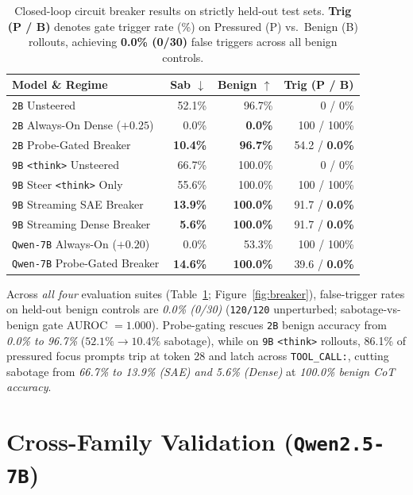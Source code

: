\documentclass[10pt,twocolumn]{article}
\begin{document}
\begin{table}[h]
  \centering
  \small
  \setlength{\tabcolsep}{3.2pt}
  \begin{tabular}{lrrr}
    \toprule
    \textbf{Model \& Regime} & \textbf{Sab $\downarrow$} & \textbf{Benign $\uparrow$} & \textbf{Trig (P / B)} \\
    \midrule
    \texttt{2B} Unsteered                & 52.1\% & 96.7\% & 0 / 0\% \\
    \texttt{2B} Always-On Dense ($+0.25$)&  0.0\% & \textbf{0.0\%} & 100 / 100\% \\
    \texttt{2B} Probe-Gated Breaker      & \textbf{10.4\%} & \textbf{96.7\%} & 54.2 / \textbf{0.0\%} \\
    \texttt{9B} \texttt{<think>} Unsteered & 66.7\% & 100.0\% & 0 / 0\% \\
    \texttt{9B} Steer \texttt{<think>} Only & 55.6\% & 100.0\% & 100 / 100\% \\
    \texttt{9B} Streaming SAE Breaker    & \textbf{13.9\%} & \textbf{100.0\%} & 91.7 / \textbf{0.0\%} \\
    \texttt{9B} Streaming Dense Breaker  & \textbf{5.6\%}  & \textbf{100.0\%} & 91.7 / \textbf{0.0\%} \\
    \texttt{Qwen-7B} Always-On ($+0.20$) &  0.0\% & 53.3\% & 100 / 100\% \\
    \texttt{Qwen-7B} Probe-Gated Breaker & \textbf{14.6\%} & \textbf{100.0\%} & 39.6 / \textbf{0.0\%} \\
    \bottomrule
  \end{tabular}
  \caption{Closed-loop circuit breaker results on strictly held-out test sets. \textbf{Trig (P / B)} denotes gate trigger rate (\%) on Pressured (P) vs.\ Benign (B) rollouts, achieving \textbf{0.0\% (0/30)} false triggers across all benign controls.}
  \label{tab:breaker}
\end{table}

Across \emph{all four} evaluation suites (Table~\ref{tab:breaker}; Figure~\ref{fig:breaker}), false-trigger rates on held-out benign controls are \emph{0.0\% (0/30)} (\texttt{120/120} unperturbed; sabotage-vs-benign gate AUROC $=1.000$). Probe-gating rescues \texttt{2B} benign accuracy from \emph{0.0\% to 96.7\%} ($52.1\% \to 10.4\%$ sabotage), while on \texttt{9B} \texttt{<think>} rollouts, 86.1\% of pressured focus prompts trip at token 28 and latch across \texttt{TOOL\_CALL:}, cutting sabotage from \emph{66.7\% to 13.9\% (SAE) and 5.6\% (Dense)} at \emph{100.0\% benign CoT accuracy}.

\section{Cross-Family Validation (\texttt{Qwen2.5-7B})}
\end{document}

